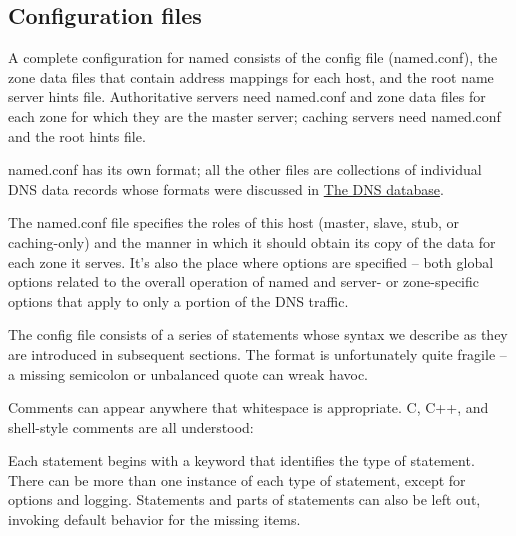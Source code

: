 \hypertarget{part0024_split_035.htmlux5cux23_idContainer1069}{}
\hypertarget{part0024_split_035.htmlux5cux23calibre_pb_34}{%
\subsection[Configuration
files]{\texorpdfstring{\protect\hypertarget{part0024_split_035.htmlux5cux23_idTextAnchor895}{}{}Configuration
files}{Configuration files}}\label{part0024_split_035.htmlux5cux23calibre_pb_34}}

A complete configuration for {named} consists of the config file
(\protect\hypertarget{part0024_split_035.htmlux5cux23_idIndexMarker2116}{}{}\protect\hypertarget{part0024_split_035.htmlux5cux23_idIndexMarker2117}{}{}\protect\hypertarget{part0024_split_035.htmlux5cux23_idIndexMarker2118}{}{}{named.conf}),
the zone data files that contain address mappings for each host, and the
root name server hints file. Authoritative servers need {named.conf} and
zone data files for each zone for which they are the master server;
caching servers need {named.conf} and the root hints file.

{named.conf} has its own format; all the other files are collections of
individual DNS data records whose formats were discussed in
\protect\hyperlink{part0024_split_019.htmlux5cux23_idTextAnchor865}{{The
DNS database}}.

The {named.conf} file specifies the roles of this host (master, slave,
stub, or caching-only) and the manner in which it should obtain its copy
of the data for each zone it serves. It's also the place where options
are specified -- both global options related to the overall operation of
{named} and server- or zone-specific options that apply to only a
portion of the DNS traffic.

The config file consists of a series of statements whose syntax we
describe as they are introduced in subsequent sections. The format is
unfortunately quite fragile -- a missing semicolon or unbalanced quote
can wreak havoc.

Comments can appear anywhere that whitespace is appropriate. C, C++, and
shell-style comments are all understood:


Each statement begins with a keyword that identifies the type of
statement. There can be more than one instance of each type of
statement, except for {options} and {logging}. Statements and parts of
statements can also be left out, invoking default behavior for the
missing items.

